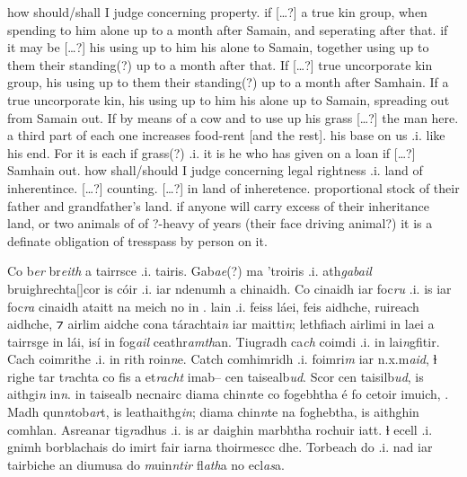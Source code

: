 \documentclass[11pt]{article}
\begin{document}
\begin{pages}
\begin{Rightside}
    \pstart
    how should/shall I judge concerning property. if [\ldots?] a true kin group, when spending to him alone up to a month after Samain, and seperating after that. if it may be [\ldots?] his using up to him his alone to Samain, together using up to them their standing(?) up to a month after that.  If [\ldots?] true uncorporate kin group, his using up to them their standing(?) up to a month after Samhain.  If a true uncorporate kin, his using up to him his alone up to Samain, spreading out from Samain out.  If by means of a cow and to use up his grass [\ldots?] the man here.  a third part of each one increases food-rent [and the rest].\hspace{2mm} his base on us .i. like his end. For it is each if grass(?) .i. it is he who has given on a loan if [\ldots?] Samhain out.  how shall/should I judge concerning legal rightness .i. land of inherentince.  [\ldots?] counting.  [\ldots?] in land of inheretence.  proportional stock of their father and grandfather's land. if anyone will carry excess of their inheritance land, or two animals of of ?-heavy of years (their face driving animal?) it is a definate obligation of tresspass by person on it. 

    \pend
  \endnumbering
  \end{Rightside}

  \Pages
 
  \begin{Leftside}
    \beginnumbering
    \pstart
    Co b\emph{er} br\emph{eith} a tairrsce .i.  tairis.  Gab\emph{ae}(?) ma 'troiris .i. ath\emph{gabail} bruighrechta[\hspace{2mm}]cor is c\'{o}ir .i. iar ndenumh a chinaidh.  Co cinaidh iar foc\emph{ru} .i. is iar foc\emph{ra} cinaidh ataitt na meich no in .   lain .i. feiss l\'{a}ei, feis aidhche, ruireach aidhche, ⁊ airlim aidche cona t\'{a}rachtai\emph{n} iar maitti\emph{n}; lethfiach airlimi in laei a tairrsge in l\'{a}i, is\'{i} in fog\emph{ail} ceathr\emph{amth}an.  Tiugradh  ca\emph{ch} coimdi .i. in lai\emph{n}gfitir.  Cach coimrithe .i. in rith roin\emph{n}e.  Catch comhimridh .i. foimri\emph{m} iar n.x.m\emph{aid}, ɫ righe tar t\emph{r}achta co fis a et\emph{racht} imab-- cen taisealb\emph{ud}.  Scor cen taisilb\emph{ud}, is aithgi\emph{n} in\emph{n}.  in taisealb necnairc diama chin\emph{n}te co fogebhtha \'{e} fo cetoir imuich, .  Madh qun\emph{n}tob\emph{ar}t, is leathaithg\emph{in}; diama chin\emph{n}te na foghebtha, is aithghin comhlan.  Asreanar tig\emph{r}adhus .i. is ar daighin marbhtha rochuir iatt. ɫ ecell .i. gnimh borblachais do imirt fair iarna thoirmescc dhe. Torbeach do  .i. nad iar tairbiche an diumusa do \emph{m}uin\emph{ntir} fl\emph{ath}a no ecl\emph{as}a. 
        \pend
  \endnumbering
  \end{Leftside}


\end{pages}
\end{document}
